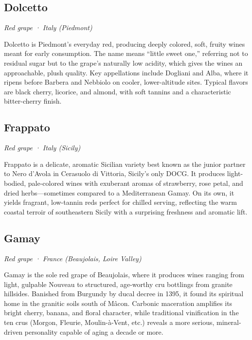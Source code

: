 \subsection*{Dolcetto}
\textit{Red grape · Italy (Piedmont)}\par\smallskip

Dolcetto is Piedmont’s everyday red, producing deeply colored, soft, fruity wines meant for early consumption. The name means “little sweet one,” referring not to residual sugar but to the grape’s naturally low acidity, which gives the wines an approachable, plush quality. Key appellations include Dogliani and Alba, where it ripens before Barbera and Nebbiolo on cooler, lower-altitude sites. Typical flavors are black cherry, licorice, and almond, with soft tannins and a characteristic bitter-cherry finish.

\subsection*{Frappato}
\textit{Red grape · Italy (Sicily)}\par\smallskip

Frappato is a delicate, aromatic Sicilian variety best known as the junior partner to Nero d’Avola in Cerasuolo di Vittoria, Sicily’s only DOCG. It produces light-bodied, pale-colored wines with exuberant aromas of strawberry, rose petal, and dried herbs—sometimes compared to a Mediterranean Gamay. On its own, it yields fragrant, low-tannin reds perfect for chilled serving, reflecting the warm coastal terroir of southeastern Sicily with a surprising freshness and aromatic lift.

\subsection*{Gamay}
\textit{Red grape · France (Beaujolais, Loire Valley)}\par\smallskip

Gamay is the sole red grape of Beaujolais, where it produces wines ranging from light, gulpable Nouveau to structured, age-worthy cru bottlings from granite hillsides. Banished from Burgundy by ducal decree in 1395, it found its spiritual home in the granitic soils south of Mâcon. Carbonic maceration amplifies its bright cherry, banana, and floral character, while traditional vinification in the ten crus (Morgon, Fleurie, Moulin-à-Vent, etc.) reveals a more serious, mineral-driven personality capable of aging a decade or more.

